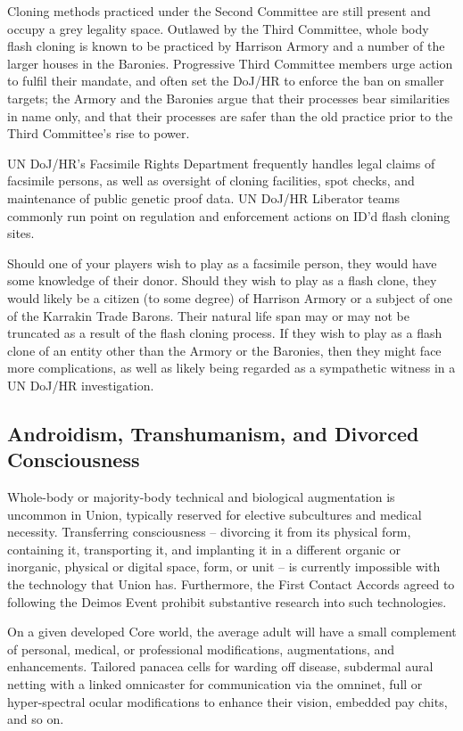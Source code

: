 Cloning methods practiced under the Second Committee are still present and occupy a grey
legality space. Outlawed by the Third Committee, whole body flash cloning is known to be
practiced by Harrison Armory and a number of the larger houses in the Baronies. Progressive
Third Committee members urge action to fulfil their mandate, and often set the DoJ/HR to
enforce the ban on smaller targets; the Armory and the Baronies argue that their processes bear
similarities in name only, and that their processes are safer than the old practice prior to the Third
Committee’s rise to power.

UN DoJ/HR’s Facsimile Rights Department frequently handles legal claims of facsimile persons,
as well as oversight of cloning facilities, spot checks, and maintenance of public genetic proof
data. UN DoJ/HR Liberator teams commonly run point on regulation and enforcement actions on
ID’d flash cloning sites.

Should one of your players wish to play as a facsimile person, they would have some knowledge
of their donor. Should they wish to play as a flash clone, they would likely be a citizen (to some
degree) of Harrison Armory or a subject of one of the Karrakin Trade Barons. Their natural life
span may or may not be truncated as a result of the flash cloning process. If they wish to play as
a flash clone of an entity other than the Armory or the Baronies, then they might face more
complications, as well as likely being regarded as a sympathetic witness in a UN DoJ/HR
investigation.

\subsection{Androidism, Transhumanism, and Divorced Consciousness}

Whole-body or majority-body technical and biological augmentation is uncommon in Union,
typically reserved for elective subcultures and medical necessity. Transferring consciousness --
divorcing it from its physical form, containing it, transporting it, and implanting it in a different
organic or inorganic, physical or digital space, form, or unit -- is currently impossible with the
technology that Union has. Furthermore, the First Contact Accords agreed to following the
Deimos Event prohibit substantive research into such technologies.

On a given developed Core world, the average adult will have a small complement of personal,
medical, or professional modifications, augmentations, and enhancements. Tailored panacea
cells for warding off disease, subdermal aural netting with a linked omnicaster for communication
via the omninet, full or hyper-spectral ocular modifications to enhance their vision, embedded
pay chits, and so on.

